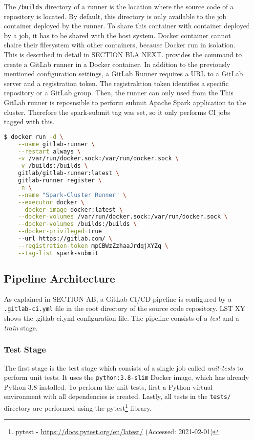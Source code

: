 The \texttt{/builds} directory of a runner is the location where the source code of a repository is located. By default, this directory is only available to the job container deployed by the runner. To share this container with container deployed by a job, it has to be shared with the host system. Docker container cannot shaire their filesystem with other containers, because Docker run in isolation. This is described in detail in SECTION BLA NEXT.
 provides the command to create a GitLab runner in a Docker container.
In addition to the previously mentioned configuration settings, a GitLab Runner requires a URL to a GitLab server and a registration token.
%
The registraktion token identifies a specific repository or a GitLab group. Then, the runner can only used from the 
%
This GitLab runner is reposnsible to perform submit Apache Spark application to the cluster. Therefore the spark-submit tag was set, so it only performs CI jobs tagged with this.

\begin{lstlisting}[label=lst:06_ci_runner_container_cmd, caption=CLI command to start a GitLab runner in a Docker container, language=bash]
$ docker run -d \
    --name gitlab-runner \
    --restart always \
    -v /var/run/docker.sock:/var/run/docker.sock \
    -v /builds:/builds \
    gitlab/gitlab-runner:latest \
    gitlab-runner register \
    -n \
    --name "Spark-Cluster Runner" \
    --executor docker \
    --docker-image docker:latest \
    --docker-volumes /var/run/docker.sock:/var/run/docker.sock \
    --docker-volumes /builds:/builds \
    --docker-privileged=true
    --url https://gitlab.com/ \
    --registration-token mpCBWzZzhaaJrdqjXYZq \
    --tag-list spark-submit
\end{lstlisting}


\subsection{Pipeline Architecture}
%
As explained in SECTION AB, a GitLab CI/CD pipeline is configured by a \texttt{.gitlab-ci.yml} file in the root directory of the source code repository.
%
LST XY shows the .gitlab-ci.yml configuration file. The pipeline consists of a \textit{test} and a \textit{train} stage.


\subsubsection{Test Stage}
The first stage is the test stage which consists of a single job called \textit{unit-tests} to perform unit tests.
It uses the \texttt{python:3.8-slim} Docker image, which has already Python 3.8 installed. To perform the unit tests, first a Python virtual environment with all dependencies is created. Lastly, all tests in the \texttt{tests/} directory are performed using the pytest\footnote{pytest - \url{https://docs.pytest.org/en/latest/} (Accessed: 2021-02-01)} library.


